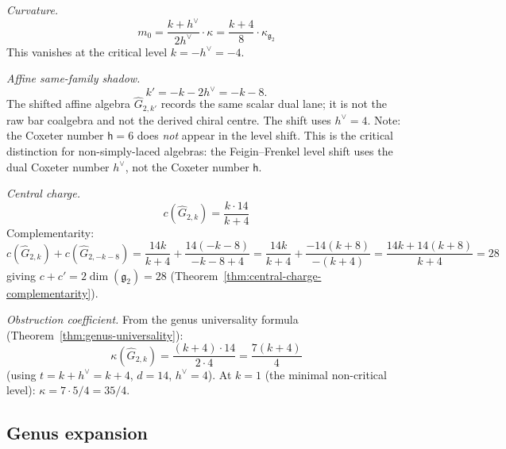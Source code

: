 \begin{computation}
\label{comp:G2-curvature}

\emph{Curvature.}
\begin{equation}
m_0 = \frac{k + h^\vee}{2h^\vee}\cdot\kappa
= \frac{k+4}{8}\cdot\kappa_{\mathfrak{g}_2}
\end{equation}
This vanishes at the critical level $k = -h^\vee = -4$.

\emph{Affine same-family shadow.}
\begin{equation}\label{eq:G2-level-shift}
k'=-k-2h^\vee=-k-8.
\end{equation}
The shifted affine algebra $\widehat{G}_{2,k'}$ records the same
scalar dual lane; it is not the raw bar coalgebra and not the derived
chiral centre. The shift uses $h^\vee = 4$.
Note: the Coxeter number $\mathsf{h} = 6$ does \emph{not} appear in the
level shift. This is the critical distinction for non-simply-laced
algebras: the Feigin--Frenkel level shift uses the dual Coxeter number $h^\vee$, not the Coxeter number $\mathsf{h}$.

\emph{Central charge.}
\begin{equation}
c(\widehat{G}_{2,k}) = \frac{k \cdot 14}{k + 4}
\end{equation}
Complementarity:
\begin{equation}
c(\widehat{G}_{2,k}) + c(\widehat{G}_{2,-k-8})
= \frac{14k}{k+4} + \frac{14(-k-8)}{-k-8+4}
= \frac{14k}{k+4} + \frac{-14(k+8)}{-(k+4)}
= \frac{14k + 14(k+8)}{k+4} = 28
\end{equation}
giving $c + c' = 2\dim(\mathfrak{g}_2) = 28$
(Theorem~\ref{thm:central-charge-complementarity}).

\emph{Obstruction coefficient.}
From the genus universality formula
(Theorem~\ref{thm:genus-universality}):
\begin{equation}\label{eq:G2-kappa}
\kappa(\widehat{G}_{2,k}) = \frac{(k+4) \cdot 14}{2 \cdot 4}
= \frac{7(k+4)}{4}
\end{equation}
(using $t = k + h^\vee = k + 4$, $d = 14$, $h^\vee = 4$).
At $k = 1$ (the minimal non-critical level):
$\kappa = 7 \cdot 5/4 = 35/4$.
\end{computation}

\subsection{Genus expansion}

